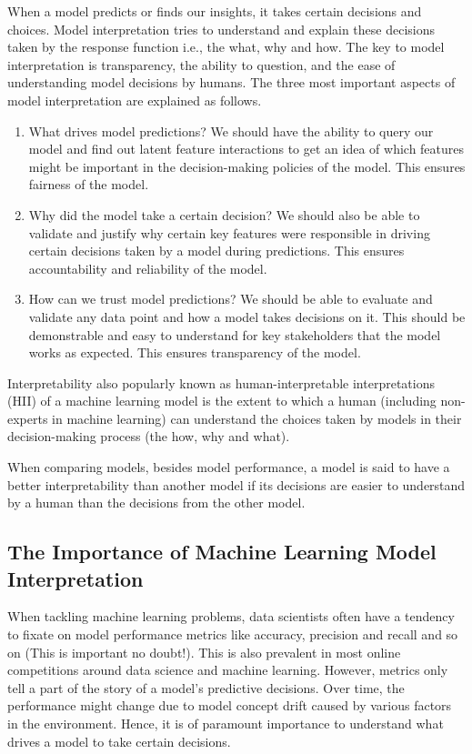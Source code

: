     When a model predicts or finds our insights, it takes certain decisions and choices. Model interpretation tries to understand and explain these decisions taken by the response function i.e., the what, why and how. The key to model interpretation is transparency, the ability to question, and the ease of understanding model decisions by humans. The three most important aspects of model interpretation are explained as follows.

    \begin{enumerate}
        \item What drives model predictions? We should have the ability to query our model and find out latent feature interactions to get an idea of which features might be important in the decision-making policies of the model. This ensures fairness of the model.
        \item Why did the model take a certain decision? We should also be able to validate and justify why certain key features were responsible in driving certain decisions taken by a model during predictions. This ensures accountability and reliability of the model.
        \item How can we trust model predictions? We should be able to evaluate and validate any data point and how a model takes decisions on it. This should be demonstrable and easy to understand for key stakeholders that the model works as expected. This ensures transparency of the model.
    \end{enumerate}
    
Interpretability also popularly known as human-interpretable interpretations (HII) of a machine learning model is the extent to which a human (including non-experts in machine learning) can understand the choices taken by models in their decision-making process (the how, why and what).\par\vspace{1em}

When comparing models, besides model performance, a model is said to have a better interpretability than another model if its decisions are easier to understand by a human than the decisions from the other model.\cite{WEBSITE:model-interpretation-medium}

\subsection{The Importance of Machine Learning Model Interpretation}
    When tackling machine learning problems, data scientists often have a tendency to fixate on model performance metrics like accuracy, precision and recall and so on (This is important no doubt!). This is also prevalent in most online competitions around data science and machine learning. However, metrics only tell a part of the story of a model’s predictive decisions. Over time, the performance might change due to model concept drift caused by various factors in the environment. Hence, it is of paramount importance to understand what drives a model to take certain decisions.\par\vspace{1em}

